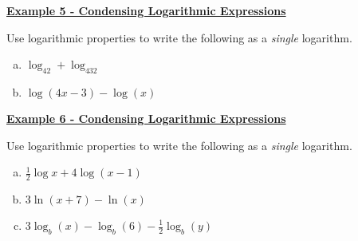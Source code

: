 \documentclass[12pt]{book}
\newcommand{\D}{\displaystyle}
\begin{document}
\underline{\textbf{Example 5 - Condensing Logarithmic Expressions}}

Use logarithmic properties to write the following as a \textit{single} logarithm. 
\begin{multicols}{2}
    \begin{enumerate}[(a)]
    \item $\D \log_42 + \log_432$
    \item $\D \log (4x-3) - \log(x)$
\end{enumerate}
\end{multicols}

\newpage

\underline{\textbf{Example 6 - Condensing Logarithmic Expressions}}

Use logarithmic properties to write the following as a \textit{single} logarithm. 

    \begin{enumerate}[(a)]
    \item $\D \frac{1}{2}\log x + 4\log(x-1)$
    \vspace{50mm}
    \item $\D 3\ln(x+7)-\ln(x)$
    \vspace{50mm}
    \item $\D 3\log_b(x)-\log_b(6)-\frac{1}{2}\log_b(y)$
\end{enumerate}
\end{document}
